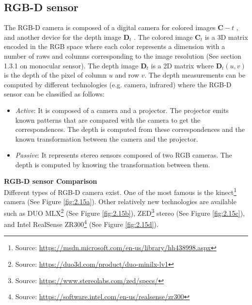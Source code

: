 \documentclass[11pt,openany]{book}
\begin{document}
\subsection{RGB-D sensor}
The RGB-D camera is composed of a digital camera for colored images $\mathbf{C}-t$ , and another device for the depth image $\mathbf{D}_t$ . The colored image $\mathbf{C}_t$ is a 3D matrix encoded in the RGB space where each color represents a dimension with a number of raws and columns corresponding to the image resolution (See section 1.3.1 on monocular sensor). The depth image $\mathbf{D}_t$ is a 2D matrix where $\mathbf{D}_t(u,v)$ is the depth of the pixel of column $u$ and row $v$. The depth measurements can be computed by diﬀerent technologies (e.g. camera, infrared) where the RGB-D sensor can be classiﬁed as follows:
\begin{itemize}
    \item \textit{Active}: It is composed of a camera and a projector. The projector emits known patterns that are compared with the camera to get the correspondences. The depth is computed from these correspondences and the known transformation between the camera and the projector.
    \item \textit{Passive}: It represents stereo sensors composed of two RGB cameras. The depth is computed by knowing the transformation between them.
\end{itemize}
\textbf{RGB-D sensor Comparison}\\
Diﬀerent types of RGB-D camera exist. One of the most famous is the kinect\footnote{Source: \url{https://msdn.microsoft.com/en-us/library/hh438998.aspx}} camera (See Figure \ref{fig:2.15a}). Other relatively new technologies are available such as DUO MLX\footnote{Source: \url{https://duo3d.com/product/duo-minilx-lv1}} (See Figure \ref{fig:2.15b}), ZED\footnote{Source: \url{https://www.stereolabs.com/zed/specs/}} stereo (See Figure \ref{fig:2.15c}), and Intel RealSense ZR300\footnote{Source: \url{https://software.intel.com/en-us/realsense/zr300}} (See Figure \ref{fig:2.15d}).
\end{document}

